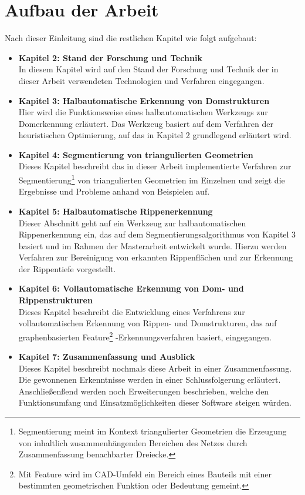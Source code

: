 \newpage

\section{Aufbau der Arbeit}
Nach dieser Einleitung sind die restlichen Kapitel wie folgt aufgebaut:

\begin{itemize}
\item  \textbf{Kapitel 2: Stand der Forschung und Technik}\\
In diesem Kapitel wird auf den Stand der Forschung und Technik der in dieser Arbeit verwendeten Technologien und Verfahren eingegangen. 

\item  \textbf{Kapitel 3: Halbautomatische Erkennung von Domstrukturen}\\
Hier wird die Funktionsweise eines halbautomatischen Werkzeugs zur Domerkennung erl\"autert. Das Werkzeug basiert auf dem Verfahren der heuristischen Optimierung, auf das in Kapitel 2 grundlegend erl\"autert wird. 

\item  \textbf{Kapitel 4: Segmentierung von triangulierten Geometrien}\\
Dieses Kapitel beschreibt das in dieser Arbeit implementierte Verfahren zur Segmentierung\footnote{Segmentierung meint im Kontext triangulierter Geometrien die Erzeugung von inhaltlich zusammenhängenden Bereichen des Netzes durch Zusammenfassung benachbarter Dreiecke.} von triangulierten Geometrien im Einzelnen und zeigt die Ergebnisse und Probleme anhand von Beispielen auf.

\item  \textbf{Kapitel 5: Halbautomatische Rippenerkennung}\\
Dieser Abschnitt geht auf ein Werkzeug zur halbautomatischen Rippenerkennung ein, das auf dem Segmentierungsalgorithmus von Kapitel 3 basiert und im Rahmen der Masterarbeit entwickelt wurde. Hierzu werden Verfahren zur Bereinigung von erkannten Rippenfl\"achen und zur Erkennung der Rippentiefe vorgestellt.

\item  \textbf{Kapitel 6: Vollautomatische Erkennung von Dom- und Rippenstrukturen}\\
Dieses Kapitel beschreibt die Entwicklung eines Verfahrens zur vollautomatischen Erkennung von Rippen- und Domstrukturen, das auf graphenbasierten Feature\footnote{Mit Feature wird im CAD-Umfeld ein Bereich eines Bauteils mit einer bestimmten geometrischen Funktion oder Bedeutung gemeint.} -Erkennungsverfahren basiert, eingegangen. 

\item  \textbf{Kapitel 7: Zusammenfassung und Ausblick}\\
Dieses Kapitel beschreibt nochmals diese Arbeit in einer Zusammenfassung. Die gewonnenen Erkenntnisse werden in einer Schlussfolgerung erl\"autert. Anschließen{\ss}end werden noch Erweiterungen beschrieben, welche den Funktionsumfang und Einsatzm\"oglichkeiten dieser Software steigen w\"urden.

\end{itemize}

